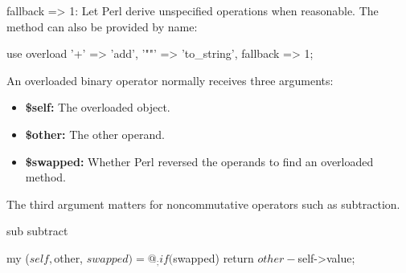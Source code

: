 \documentclass{report}
\begin{document}
\begin{itemize}
            \bigbreak \noindent 
            fallback => 1: Let Perl derive unspecified operations when reasonable. The method can also be provided by name:
            \bigbreak \noindent 
            \begin{perlcode}
                use overload
                    '+'  => 'add',
                    '""' => 'to_string',
                    fallback => 1;
            \end{perlcode}
            \bigbreak \noindent 
            An overloaded binary operator normally receives three arguments:
            \begin{itemize}
                \item \textbf{\$self:} The overloaded object.
                \item \textbf{\$other:} The other operand.
                \item \textbf{\$swapped:} Whether Perl reversed the operands to find an overloaded method.
            \end{itemize}
            The third argument matters for noncommutative operators such as subtraction.
            \bigbreak \noindent 
            \begin{perlcode}
                sub subtract {
                    my ($self, $other, $swapped) = @_;

                    if ($swapped) {
                        return $other - $self->{value};
                    }

}
\end{perlcode}
\end{itemize}
\end{document}
